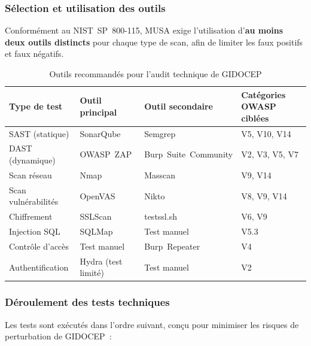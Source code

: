 \documentclass[12pt,a4paper,oneside]{report}
\begin{document}
\subsubsection{S\'election et utilisation des outils}

Conform\'ement au NIST~SP~800-115, MUSA exige l'utilisation d'\textbf{au moins
deux outils distincts} pour chaque type de scan, afin de limiter les faux positifs
et faux n\'egatifs.

\begin{table}[H]
\centering\small
\caption{Outils recommand\'es pour l'audit technique de GIDOCEP}
\label{tab:outils_tech}
\begin{tabularx}{\textwidth}{p{3cm}p{2.5cm}p{2.5cm}X}
\toprule
\rowcolor{theadcolor}
\color{white}\textbf{Type de test} &
\color{white}\textbf{Outil principal} &
\color{white}\textbf{Outil secondaire} &
\color{white}\textbf{Cat\'egories OWASP cibl\'ees} \\
\midrule
SAST (statique) & SonarQube & Semgrep & V5, V10, V14 \\
DAST (dynamique) & OWASP~ZAP & Burp~Suite~Community & V2, V3, V5, V7 \\
Scan r\'eseau & Nmap & Masscan & V9, V14 \\
Scan vuln\'erabilit\'es & OpenVAS & Nikto & V8, V9, V14 \\
Chiffrement & SSLScan & testssl.sh & V6, V9 \\
Injection SQL & SQLMap & Test manuel & V5.3 \\
Contr\^ole d'acc\`es & Test manuel & Burp~Repeater & V4 \\
Authentification & Hydra (test limit\'e) & Test manuel & V2 \\
\bottomrule
\end{tabularx}
\end{table}

\subsubsection{D\'eroulement des tests techniques}

Les tests sont ex\'ecut\'es dans l'ordre suivant, con\c{c}u pour minimiser les
risques de perturbation de GIDOCEP~:
\end{document}
